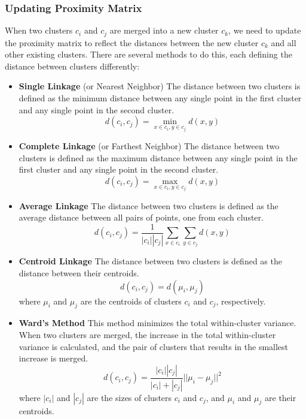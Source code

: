 \subsubsection{Updating Proximity Matrix}
When two clusters $c_i$ and $c_j$ are merged into a new cluster $c_k$, we need to update the proximity matrix to reflect the distances between the new cluster $c_k$ and all other existing clusters. There are several methods to do this, each defining the distance between clusters differently:
\begin{itemize}
	\item \textbf{Single Linkage} (or Nearest Neighbor)
	The distance between two clusters is defined as the minimum distance between any single point in the first cluster and any single point in the second cluster.
	\[d(c_i, c_j) = \min_{x \in c_i, y \in c_j} d(x, y)\]
	\item \textbf{Complete Linkage} (or Farthest Neighbor)
	The distance between two clusters is defined as the maximum distance between any single point in the first cluster and any single point in the second cluster.
	\[d(c_i, c_j) = \max_{x \in c_i, y \in c_j} d(x, y)\]
	\item \textbf{Average Linkage}
	The distance between two clusters is defined as the average distance between all pairs of points, one from each cluster.
	\[d(c_i, c_j) = \frac{1}{|c_i| |c_j|} \sum_{x \in c_i} \sum_{y \in c_j} d(x, y)\]

	\item \textbf{Centroid Linkage}
	The distance between two clusters is defined as the distance between their centroids.
	\[d(c_i, c_j) = d(\mu_i, \mu_j)\]
	where $\mu_i$ and $\mu_j$ are the centroids of clusters $c_i$ and $c_j$, respectively.
	\item \textbf{Ward's Method}
	This method minimizes the total within-cluster variance. When two clusters are merged, the increase in the total within-cluster variance is calculated, and the pair of clusters that results in the smallest increase is merged.
	\[d(c_i, c_j) = \frac{|c_i| |c_j|}{|c_i| + |c_j|} ||\mu_i - \mu_j||^2\]
	where $|c_i|$ and $|c_j|$ are the sizes of clusters $c_i$ and $c_j$, and $\mu_i$ and $\mu_j$ are their centroids.
\end{itemize}


